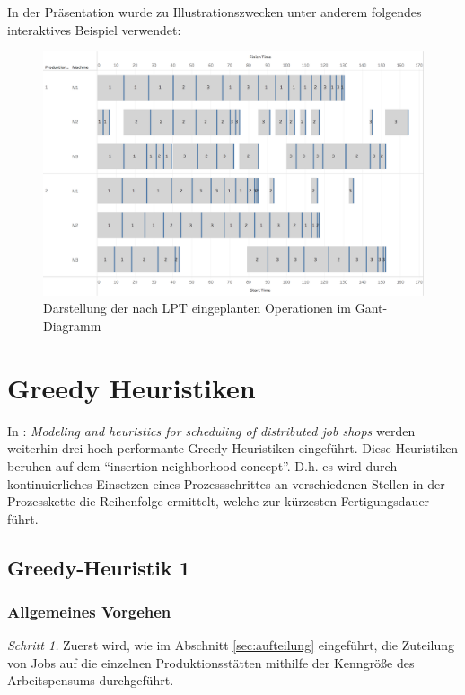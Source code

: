 \documentclass[final, english, ngerman, a4paper, 12pt, %
numbers=noenddot,
cd=true,
cdfont=false,cdfont=nohead,cdfont=nodin,
cdmath=false,
cdhead=false,
cdfoot=true,
cdcover=monochrome,
cdgeometry=symmetric,
declaration=heading,
declaration=notoc,
abstract=heading,
]{tudscrreprt}
\begin{document}
\noindent
In der Präsentation wurde zu Illustrationszwecken unter anderem folgendes interaktives Beispiel verwendet:
\begin{figure}[H]
	\centering
	\includegraphics[width=\textwidth]{./settings/lpt}
	\caption[Interaktives Beispiel - Einplanung nach der LPT Regel]{Darstellung der nach LPT eingeplanten Operationen im Gant-Diagramm\footnotemark}\label{fig:spt}
\end{figure}


\section{Greedy Heuristiken}

In \cite{djs-modeling}: \textit{Modeling and heuristics for scheduling of distributed job shops} werden weiterhin drei hoch-performante Greedy-Heuristiken eingeführt. Diese Heuristiken beruhen auf dem “insertion neighborhood concept”. D.h. es wird durch kontinuierliches Einsetzen eines Prozessschrittes an verschiedenen Stellen in der Prozesskette die Reihenfolge ermittelt, welche zur kürzesten Fertigungsdauer führt.

\subsection{Greedy-Heuristik 1}

\subsubsection{Allgemeines Vorgehen}
\noindent
\textit{Schritt 1.} Zuerst wird, wie im Abschnitt \ref{sec:aufteilung} eingeführt, die Zuteilung von Jobs auf die einzelnen Produktionsstätten mithilfe der Kenngröße des Arbeitspensums durchgeführt.\\
\end{document}
